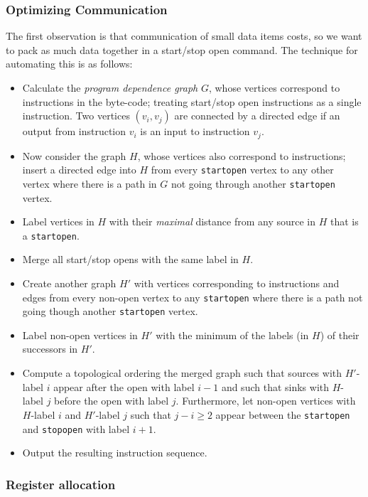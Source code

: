 \subsubsection{Optimizing Communication}

The first observation is that communication of small data items
costs, so we want to pack as much data together in a start/stop open
command. 
The technique for automating this is as follows:
\begin{itemize}
  \item Calculate the \textit{program dependence graph} $G$, whose vertices correspond to
        instructions in the byte-code;
        treating start/stop open instructions as a single instruction.
        Two vertices $(v_i,v_j)$ are connected by a directed edge if an output from 
        instruction $v_i$ is an input to instruction $v_j$.
  \item Now consider the graph $H$, whose vertices also correspond to
    instructions; insert a directed edge into $H$ from every
    \verb+startopen+ vertex to any other vertex where there is a path
    in $G$ not going through another \verb+startopen+ vertex.
  \item Label vertices in $H$ with their {\em maximal} distance from
    any source in $H$ that is a \verb+startopen+.
  \item Merge all start/stop opens with the same label in $H$.
  \item Create another graph $H'$ with vertices corresponding to
    instructions and edges from every non-open vertex to any
    \verb+startopen+ where there is a path not going though another
    \verb+startopen+ vertex.
  \item Label non-open vertices in $H'$ with the minimum of the labels
    (in $H$) of their successors in $H'$.
  \item Compute a topological ordering the merged graph such that
    sources with $H'$-label $i$ appear after the open with label $i-1$
    and such that sinks with $H$-label $j$ before the open with label
    $j$. Furthermore, let non-open vertices with $H$-label $i$ and
    $H'$-label $j$ such that $j - i \ge 2$ appear between the
    \verb+startopen+ and \verb+stopopen+ with label $i+1$.
  \item Output the resulting instruction sequence.
\end{itemize}

\subsubsection{Register allocation}
\label{sec:regalloc}

